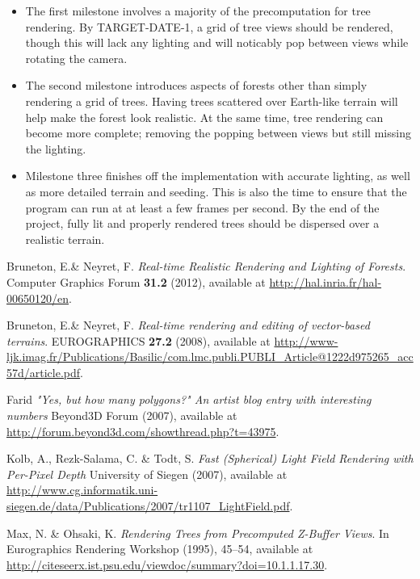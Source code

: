 \documentclass{article}
\begin{document}
\begin {itemize}
\item The first milestone involves a majority of the precomputation for tree rendering. By TARGET-DATE-1, a grid of tree views should be rendered, though this will lack any lighting and will noticably pop between views while rotating the camera.

\item The second milestone introduces aspects of forests other than simply rendering a grid of trees. Having trees scattered over Earth-like terrain will help make the forest look realistic. At the same time, tree rendering can become more complete; removing the popping between views but still missing the lighting.

\item Milestone three finishes off the implementation with accurate lighting, as well as more detailed terrain and seeding. This is also the time to ensure that the program can run at at least a few frames per second. By the end of the project, fully lit and properly rendered trees should be dispersed over a realistic terrain.
\end {itemize}

\newpage
\begin{thebibliography}{9}

  Bruneton, E.\& Neyret, F.
  \emph{Real-time Realistic Rendering and Lighting of Forests}.
  Computer Graphics Forum \textbf{31.2} (2012), available at
  \url{http://hal.inria.fr/hal-00650120/en}.

  Bruneton, E.\& Neyret, F.
  \emph{Real-time rendering and editing of vector-based terrains}.
  EUROGRAPHICS \textbf{27.2} (2008), available at
  \url{http://www-ljk.imag.fr/Publications/Basilic/com.lmc.publi.PUBLI_Article@1222d975265_acc57d/article.pdf}.

  Farid
  \emph{"Yes, but how many polygons?" An artist blog entry with interesting numbers}
  Beyond3D Forum (2007), available at
  \url{http://forum.beyond3d.com/showthread.php?t=43975}.

  Kolb, A., Rezk-Salama, C. \& Todt, S.
  \emph{Fast (Spherical) Light Field Rendering with Per-Pixel Depth}
  University of Siegen (2007), available at
  \url{http://www.cg.informatik.uni-siegen.de/data/Publications/2007/tr1107_LightField.pdf}.

  Max, N. \& Ohsaki, K.
  \emph{Rendering Trees from Precomputed Z-Buffer Views}.
  In Eurographics Rendering Workshop (1995), 45--54, available at
  \url{http://citeseerx.ist.psu.edu/viewdoc/summary?doi=10.1.1.17.30}.

\end{thebibliography}
\end{document}
